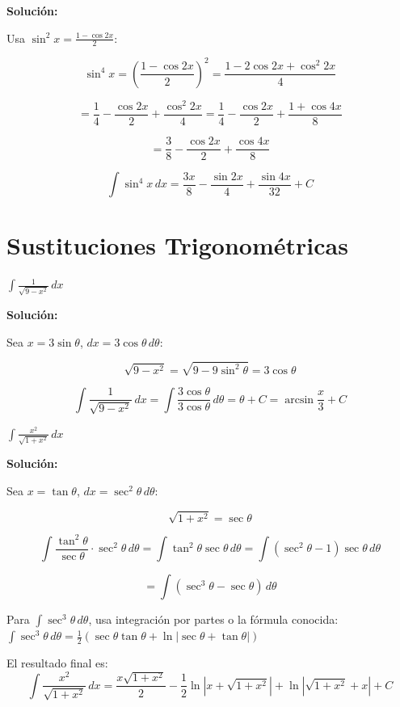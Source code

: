 \documentclass[12pt, a4paper]{book}
\begin{document}
\textbf{Solución:}

Usa $\sin^2 x = \frac{1-\cos 2x}{2}$:

\[
\sin^4 x = \left(\frac{1-\cos 2x}{2}\right)^2 = \frac{1 - 2\cos 2x + \cos^2 2x}{4}
\]

\[
= \frac{1}{4} - \frac{\cos 2x}{2} + \frac{\cos^2 2x}{4} = \frac{1}{4} - \frac{\cos 2x}{2} + \frac{1+\cos 4x}{8}
\]

\[
= \frac{3}{8} - \frac{\cos 2x}{2} + \frac{\cos 4x}{8}
\]

\[
\int \sin^4 x \, dx = \frac{3x}{8} - \frac{\sin 2x}{4} + \frac{\sin 4x}{32} + C
\]

\section{Sustituciones Trigonométricas}

\begin{ejercicio}
$\int \frac{1}{\sqrt{9-x^2}} \, dx$
\end{ejercicio}

\textbf{Solución:}

Sea $x = 3\sin\theta$, $dx = 3\cos\theta \, d\theta$:

\[
\sqrt{9-x^2} = \sqrt{9-9\sin^2\theta} = 3\cos\theta
\]

\[
\int \frac{1}{\sqrt{9-x^2}} \, dx = \int \frac{3\cos\theta}{3\cos\theta} \, d\theta = \theta + C = \arcsin\frac{x}{3} + C
\]

\begin{ejercicio}
$\int \frac{x^2}{\sqrt{1+x^2}} \, dx$
\end{ejercicio}

\textbf{Solución:}

Sea $x = \tan\theta$, $dx = \sec^2\theta \, d\theta$:

\[
\sqrt{1+x^2} = \sec\theta
\]

\[
\int \frac{\tan^2\theta}{\sec\theta} \cdot \sec^2\theta \, d\theta = \int \tan^2\theta \sec\theta \, d\theta = \int (\sec^2\theta - 1)\sec\theta \, d\theta
\]

\[
= \int (\sec^3\theta - \sec\theta) \, d\theta
\]

Para $\int \sec^3\theta \, d\theta$, usa integración por partes o la fórmula conocida:
$\int \sec^3\theta \, d\theta = \frac{1}{2}(\sec\theta\tan\theta + \ln|\sec\theta + \tan\theta|)$

El resultado final es:
\[
\int \frac{x^2}{\sqrt{1+x^2}} \, dx = \frac{x\sqrt{1+x^2}}{2} - \frac{1}{2}\ln|x + \sqrt{1+x^2}| + \ln|\sqrt{1+x^2} + x| + C
\]
\end{document}
